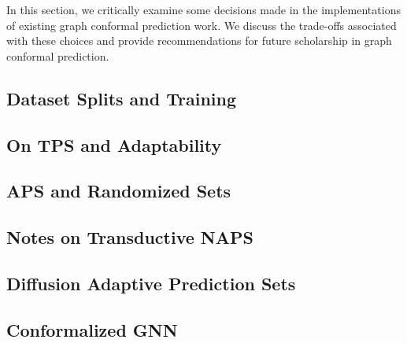 In this section, we critically examine some decisions made in the implementations of existing graph conformal prediction work.
We discuss the trade-offs associated with these choices and provide recommendations for future scholarship in graph conformal prediction.

\subsection{Dataset Splits and Training}



\subsection{On TPS and Adaptability}


\subsection{APS and Randomized Sets}


\subsection{Notes on Transductive NAPS}


\subsection{Diffusion Adaptive Prediction Sets}


\subsection{Conformalized GNN}

